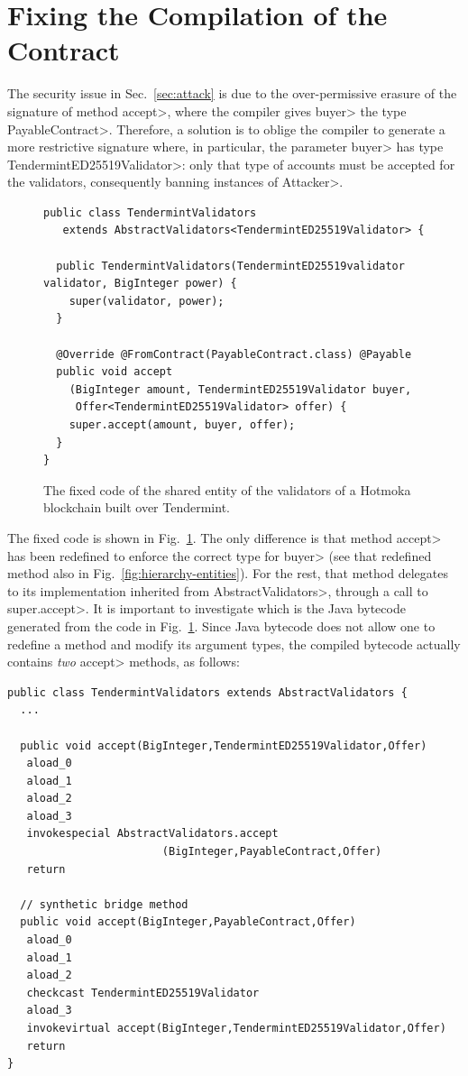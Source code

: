 \section{Fixing the Compilation of the Contract}\label{sec:fix}

The security issue in Sec.~\ref{sec:attack} is due to the
over-permissive erasure of the signature of method \<accept>,
where the compiler gives \<buyer> the type \<PayableContract>.
Therefore, a solution is to oblige the compiler to generate a more
restrictive signature where, in particular, the parameter \<buyer>
has type \<TendermintED25519Validator>: only that type of accounts
must be accepted for the validators, consequently banning instances of \<Attacker>.

\begin{figure}[ht]
  \begin{center}
    \begin{lstlisting}[language=Takamaka]
public class TendermintValidators
   extends AbstractValidators<TendermintED25519Validator> {

  public TendermintValidators(TendermintED25519validator validator, BigInteger power) {
    super(validator, power);
  }

  @Override @FromContract(PayableContract.class) @Payable
  public void accept
    (BigInteger amount, TendermintED25519Validator buyer, 
     Offer<TendermintED25519Validator> offer) {
    super.accept(amount, buyer, offer);
  }
}
    \end{lstlisting}
  \end{center}
  \caption{The fixed code of the shared entity of the validators of a Hotmoka blockchain built over Tendermint.}\label{fig:solution}
\end{figure}

The fixed code is shown in Fig.~\ref{fig:solution}. The only difference is that method
\<accept> has been redefined to enforce the correct type for \<buyer>
(see that redefined method also in Fig.~\ref{fig:hierarchy-entities}). For the rest, that method
delegates to its implementation inherited from \<AbstractValidators>, through a call
to \<super.accept>.
It is important to investigate which is the Java bytecode generated from
the code in Fig.~\ref{fig:solution}. Since Java bytecode does not allow one to redefine a method
and modify its argument types, the compiled bytecode actually contains \emph{two}
\<accept> methods, as follows:

\begin{lstlisting}[language=JavaBytecode]
public class TendermintValidators extends AbstractValidators {
  ...
  
  public void accept(BigInteger,TendermintED25519Validator,Offer)
   aload_0
   aload_1
   aload_2
   aload_3
   invokespecial AbstractValidators.accept
                        (BigInteger,PayableContract,Offer)
   return

  // synthetic bridge method
  public void accept(BigInteger,PayableContract,Offer)
   aload_0
   aload_1
   aload_2
   checkcast TendermintED25519Validator
   aload_3
   invokevirtual accept(BigInteger,TendermintED25519Validator,Offer)
   return
}
\end{lstlisting}

